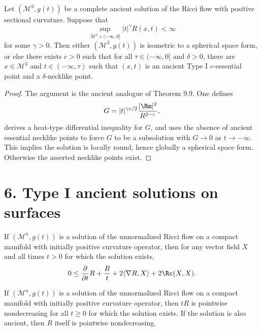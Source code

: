 \begin{theorem}
\label{ch09-thm-necklike-points-ancient}
Let \((\mathcal M^3,g(t))\) be a complete ancient solution of the Ricci flow with positive sectional curvature. Suppose that
\[
\sup_{\mathcal M^3\times(-\infty,0]}|t|^\gamma R(x,t)<\infty
\]
for some \(\gamma>0\). Then either \((\mathcal M^3,g(t))\) is isometric to a spherical space form, or else there exists \(c>0\) such that for all \(\tau\in(-\infty,0]\) and \(\delta>0\), there are \(x\in\mathcal M^3\) and \(t\in(-\infty,\tau)\) such that \((x,t)\) is an ancient Type I \(c\)-essential point and a \(\delta\)-necklike point.
\end{theorem}

\begin{proof}
\sketch The argument is the ancient analogue of Theorem 9.9. One defines
\[
G=|t|^{\gamma\varepsilon/2}\frac{|\Rm|^2}{R^{2-\varepsilon}},
\]
derives a heat-type differential inequality for \(G\), and uses the absence of ancient essential necklike points to force \(G\) to be a subsolution with \(G\to 0\) as \(t\to-\infty\). This implies the solution is locally round, hence globally a spherical space form. Otherwise the asserted necklike points exist.
\end{proof}

\section*{6. Type I ancient solutions on surfaces}

\begin{proposition}
\label{ch09-prop-lyh-trace-estimate}
If \((\mathcal M^n,g(t))\) is a solution of the unnormalized Ricci flow on a compact manifold with initially positive curvature operator, then for any vector field \(X\) and all times \(t>0\) for which the solution exists,
\[
0 \le \frac{\partial}{\partial t}R + \frac{R}{t} + 2\langle \nabla R, X\rangle + 2\Rc(X,X).
\]
\end{proposition}

\begin{corollary}
\label{ch09-cor-tR-monotone}
If \((\mathcal M^n,g(t))\) is a solution of the unnormalized Ricci flow on a compact manifold with initially positive curvature operator, then \(tR\) is pointwise nondecreasing for all \(t\ge 0\) for which the solution exists. If the solution is also ancient, then \(R\) itself is pointwise nondecreasing.
\end{corollary}

